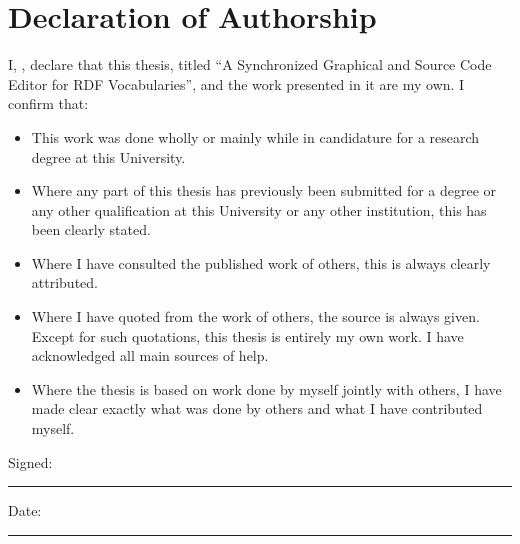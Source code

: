 \section*{Declaration of Authorship}

I, \newauthor, declare that this thesis, titled ``A Synchronized Graphical and Source Code Editor for RDF Vocabularies'', and the work presented in it are my own. I confirm that:

\begin{itemize}
\item This work was done wholly or mainly while in candidature for a research degree at this
University.
\item Where any part of this thesis has previously been submitted for a degree or any other
qualification at this University or any other institution, this has been clearly stated.
\item Where I have consulted the published work of others, this is always clearly attributed.
\item Where I have quoted from the work of others, the source is always given. Except for such quotations, this thesis is entirely my own work. I have acknowledged all main sources of help.
\item Where the thesis is based on work done by myself jointly with others, I have made clear exactly what was done by others and what I have contributed myself.\\[1cm]

\end{itemize}

Signed:\par
\rule[0.66\baselineskip]{12cm}{0.4pt}

\vspace{6mm}
Date:\par
\rule[0.66\baselineskip]{12cm}{0.4pt}
